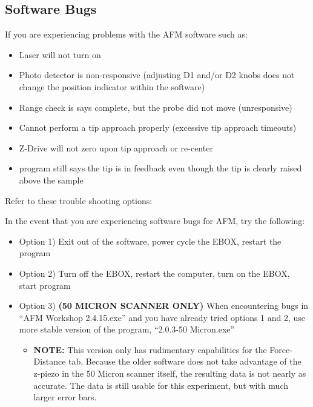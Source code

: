 \documentclass{../lab}
\begin{document}
{\subsection{Software Bugs}

If you are experiencing problems with the AFM software such as:

\begin{itemize}
    \item Laser will not turn on

    \item Photo detector is non-responsive (adjusting D1 and/or D2 knobs does not change the position indicator within the software)

    \item Range check is says complete, but the probe did not move (unresponsive)

    \item Cannot perform a tip approach properly (excessive tip approach timeouts)

    \item Z-Drive will not zero upon tip approach or re-center

    \item program still says the tip is in feedback even though the tip is clearly raised above the sample

\end{itemize}

Refer to these trouble shooting options:

In the event that you are experiencing software bugs for AFM, try the following:

\begin{itemize}
    \item Option 1) Exit out of the software, power cycle the EBOX, restart the program

    \item Option 2) Turn off the EBOX, restart the computer, turn on the EBOX, start program

    \item Option 3) \textbf{(50 MICRON SCANNER ONLY)} When encountering bugs in ``AFM Workshop 2.4.15.exe'' and you have already tried options 1 and 2, use more stable version of the program, ``2.0.3-50 Micron.exe''
    \begin{itemize}
        \item \textbf{NOTE:} This version only has rudimentary capabilities for the Force-Distance tab.  Because the older software does not take advantage of the z-piezo in the 50 Micron scanner itself, the resulting data is not nearly as accurate.  The data is still usable for this experiment, but with much larger error bars.


\end{itemize}
\end{itemize}}
\end{document}
